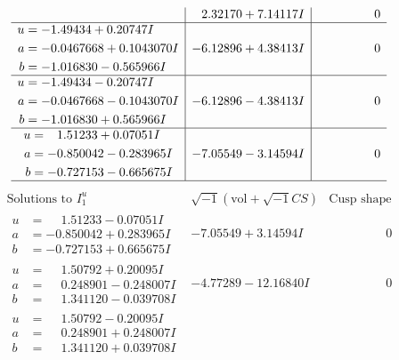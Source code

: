 \documentclass[1p]{elsarticle_modified}
\theoremstyle{definition}
\newcommand{\I}{\sqrt{-1}}
\begin{document}
$$\begin{array}{c|c|c}
 & \phantom{-}2.32170 + 7.14117 I & \phantom{-0.000000 } 0 \\ \hline\begin{aligned}
u &= -1.49434 + 0.20747 I \\
a &= -0.0467668 + 0.1043070 I \\
b &= -1.016830 - 0.565966 I\end{aligned}
 & -6.12896 + 4.38413 I & \phantom{-0.000000 } 0 \\ \hline\begin{aligned}
u &= -1.49434 - 0.20747 I \\
a &= -0.0467668 - 0.1043070 I \\
b &= -1.016830 + 0.565966 I\end{aligned}
 & -6.12896 - 4.38413 I & \phantom{-0.000000 } 0 \\ \hline\begin{aligned}
u &= \phantom{-}1.51233 + 0.07051 I \\
a &= -0.850042 - 0.283965 I \\
b &= -0.727153 - 0.665675 I\end{aligned}
 & -7.05549 - 3.14594 I & \phantom{-0.000000 } 0\\
 \hline 
 \end{array}$$\newpage$$\begin{array}{c|c|c}  
\text{Solutions to }I^u_{1}& \I (\text{vol} + \sqrt{-1}CS) & \text{Cusp shape}\\
 \hline 
\begin{aligned}
u &= \phantom{-}1.51233 - 0.07051 I \\
a &= -0.850042 + 0.283965 I \\
b &= -0.727153 + 0.665675 I\end{aligned}
 & -7.05549 + 3.14594 I & \phantom{-0.000000 } 0 \\ \hline\begin{aligned}
u &= \phantom{-}1.50792 + 0.20095 I \\
a &= \phantom{-}0.248901 - 0.248007 I \\
b &= \phantom{-}1.341120 - 0.039708 I\end{aligned}
 & -4.77289 - 12.16840 I & \phantom{-0.000000 } 0 \\ \hline\begin{aligned}
u &= \phantom{-}1.50792 - 0.20095 I \\
a &= \phantom{-}0.248901 + 0.248007 I \\
b &= \phantom{-}1.341120 + 0.039708 I\end{aligned}

\end{array}$$
\end{document}
